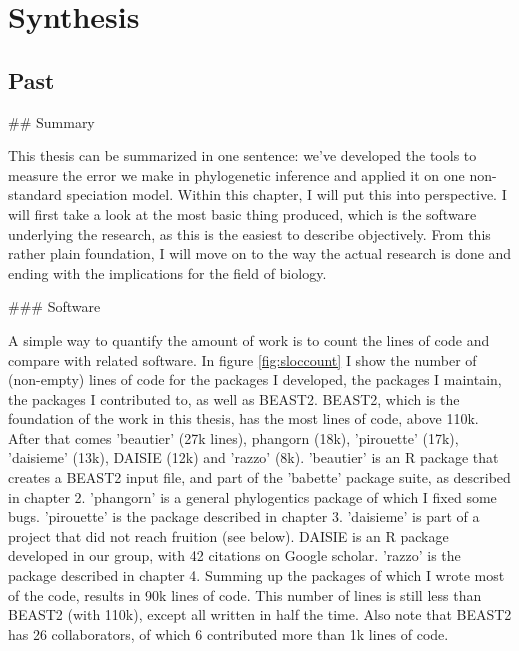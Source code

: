 \chapter{Synthesis}
\label{synthesis}
\newpage

\section{Past}

\noindent

## Summary

This thesis can be summarized in one sentence:
we've developed the tools to measure the
error we make in phylogenetic inference and
applied it on one non-standard speciation model.
Within this chapter, I will put this into perspective.
I will first take a look at the most basic thing produced,
which is the software underlying the research,
as this is the easiest to describe objectively. 
From this rather plain foundation, I will move on 
to the way the actual research is done and ending
with the implications for the field of biology.

### Software

A simple way to quantify the amount of work
is to count the lines of code and compare with related
software. In figure \ref{fig:sloccount} I show the number of
(non-empty) lines of code for the packages I developed, the packages
I maintain, the packages I contributed to, as well as BEAST2.
BEAST2, which is the foundation of the work in this thesis, 
has the most lines of code, above 110k. After that comes
'beautier' (27k lines), phangorn (18k), 'pirouette' (17k), 'daisieme' (13k), 
DAISIE (12k) and 'razzo' (8k). 
'beautier' is an R package that creates a BEAST2 
input file, and part of the 'babette' package suite, as described
in chapter 2. 
'phangorn' is a general phylogentics package of which I fixed some bugs.
'pirouette' is the package described in chapter 3. 
'daisieme' is part of a project that did not reach fruition (see below).
DAISIE is an R package developed in our group, with 42 citations on
Google scholar. 'razzo' is the package described in chapter 4.
Summing up the packages of which I wrote most of the code, results
in 90k lines of code. This number of lines is still less than 
BEAST2 (with 110k), except all written in half the time. Also note that
BEAST2 has 26 collaborators, of which 6 contributed more than 1k lines of code.

